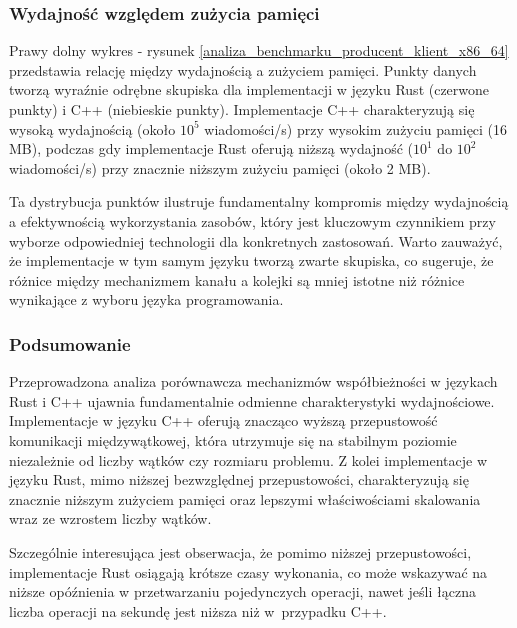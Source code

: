 \subsubsection{Wydajność względem zużycia pamięci}
Prawy dolny wykres - rysunek \ref{analiza_benchmarku_producent_klient_x86_64} przedstawia relację między wydajnością a zużyciem pamięci. Punkty danych tworzą wyraźnie odrębne skupiska dla implementacji w języku Rust (czerwone punkty) i C++ (niebieskie punkty). Implementacje C++ charakteryzują się wysoką wydajnością (około $10^5$ wiadomości/s) przy wysokim zużyciu pamięci (16 MB), podczas gdy implementacje Rust oferują niższą wydajność ($10^1$ do $10^2$ wiadomości/s) przy znacznie niższym zużyciu pamięci (około 2 MB).

Ta dystrybucja punktów ilustruje fundamentalny kompromis między wydajnością a efektywnością wykorzystania zasobów, który jest kluczowym czynnikiem przy wyborze odpowiedniej technologii dla konkretnych zastosowań. Warto zauważyć, że implementacje w tym samym języku tworzą zwarte skupiska, co sugeruje, że różnice między mechanizmem kanału a kolejki są mniej istotne niż różnice wynikające z wyboru języka programowania.

\subsubsection{Podsumowanie}
Przeprowadzona analiza porównawcza mechanizmów współbieżności w językach Rust i C++ ujawnia fundamentalnie odmienne charakterystyki wydajnościowe. Implementacje w języku C++ oferują znacząco wyższą przepustowość komunikacji międzywątkowej, która utrzymuje się na stabilnym poziomie niezależnie od liczby wątków czy rozmiaru problemu. Z kolei implementacje w języku Rust, mimo niższej bezwzględnej przepustowości, charakteryzują się znacznie niższym zużyciem pamięci oraz lepszymi właściwościami skalowania wraz ze wzrostem liczby wątków.

Szczególnie interesująca jest obserwacja, że pomimo niższej przepustowości, implementacje Rust osiągają krótsze czasy wykonania, co może wskazywać na niższe opóźnienia w przetwarzaniu pojedynczych operacji, nawet jeśli łączna liczba operacji na sekundę jest niższa niż w~przypadku C++.

